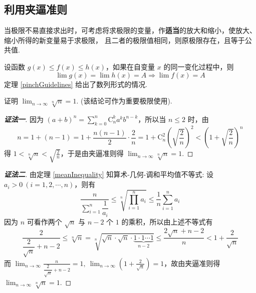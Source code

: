 \subsection{利用夹逼准则}

当极限不易直接求出时，可考虑将求极限的变量，作\textbf{适当}的放大和缩小，使放大、缩小所得的新变量易于求极限，
且二者的极限值相同，则原极限存在，且等于公共值.

\begin{theorem}[夹逼准则的函数形式]
    设函数 $g(x)\leqslant f(x)\leqslant h(x)$，如果在自变量 $x$ 的同一变化过程中，则
    $$\lim g(x)=\lim h(x)=A\Rightarrow \lim f(x)=A$$
    定理 \ref{pinchGuidelines} 给出了数列形式的情况.
\end{theorem}

\begin{example}
    证明 $\displaystyle\lim_{n\to\infty}\sqrt[n]{n}=1.$ (该结论可作为重要极限使用).
    \label{sqrtnn1}
\end{example}
\begin{proof}[{\songti \textbf{证法一}}]
    因为 $\displaystyle(a+b)^n=\sum_{k=0}^{n}\mathrm{C}_n^ka^kb^{n-k}$，所以当 $n\leqslant 2$ 时，由
    $$n=1+(n-1)=1+\frac{n(n-1)}{2}\cdot\frac{2}{n}=1+\mathrm{C}_n^2\left(\sqrt{\frac{2}{n}}\right)^2<\left(1+\sqrt{\frac{2}{n}}\right)^n$$
    得 $\displaystyle 1<\sqrt[n]{n}<\sqrt{\frac{2}{n}}$，于是由夹逼准则得 $\displaystyle\lim_{n\to\infty}\sqrt[n]{n}=1.$
\end{proof}
\begin{proof}[{\songti \textbf{证法二}}]
    由定理 \ref{meanInequality} 知算术-几何-调和平均值不等式: 设 $a_i>0~ (i=1,2,\cdots,n)$，则有
    $$\frac{n}{\displaystyle\sum_{i=1}^{n}\dfrac{1}{a_i}}\leqslant\sqrt[n]{\prod_{i=1}^{n}a_i}\leqslant \frac{1}{n}\sum_{i=1}^{n}a_i$$
    因为 $n$ 可看作两个 $\sqrt{n}$ 与 $n-2$ 个 $1$ 的乘积，所以由上述不等式有
    $$\frac{2}{\dfrac{2}{\sqrt{n}}+n-2}\leqslant\sqrt[n]{n}=\sqrt[n]{\sqrt{n}\cdot\sqrt{n}\cdot\underbrace{1\cdot1\cdots1}_{n-2}}\leqslant\frac{2\sqrt{n}+n-2}{n}<1+\frac{2}{\sqrt{n}}$$
    而 $\displaystyle\lim_{n\to\infty}\frac{n}{\dfrac{2}{\sqrt{n}}+n-2}=1,~\lim_{n\to\infty}\left(1+\frac{2}{\sqrt{n}}\right)=1$，故由夹逼准则得 $\displaystyle\lim_{n\to\infty}\sqrt[n]{n}=1.$
\end{proof}

